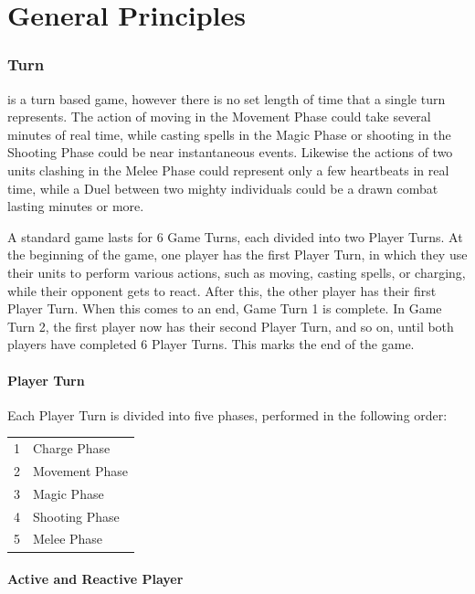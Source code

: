 
\part{General Principles}
\label{general_principles}

\section{Turn}
\label{turn}

\nameofthegame{} is a turn based game, however there is no set length of time that a single turn represents. The action of moving in the Movement Phase could take several minutes of real time, while casting spells in the Magic Phase or shooting in the Shooting Phase could be near instantaneous events. Likewise the actions of two units clashing in the Melee Phase could represent only a few heartbeats in real time, while a Duel between two mighty individuals could be a drawn combat lasting minutes or more.

A standard game lasts for 6 Game Turns, each divided into two Player Turns. At the beginning of the game, one player has the first Player Turn, in which they use their units to perform various actions, such as moving, casting spells, or charging, while their opponent gets to react. After this, the other player has their first Player Turn. When this comes to an end, Game Turn 1 is complete. In Game Turn 2, the first player now has their second Player Turn, and so on, until both players have completed 6 Player Turns. This marks the end of the game.

\subsection{Player Turn}
\label{player_turn}

Each Player Turn is divided into five phases, performed in the following order:

\hspace*{0.3cm}
\begin{tabular}{c|l}
1 & Charge Phase \tabularnewline
2 & Movement Phase \tabularnewline
3 & Magic Phase \tabularnewline
4 & Shooting Phase \tabularnewline
5 & Melee Phase \tabularnewline
\end{tabular}

\subsection{Active and Reactive Player}
\label{active_and_reactive_player}

